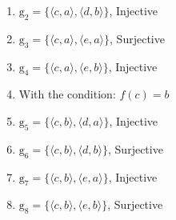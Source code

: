 \documentclass[10pt]{article}
\begin{document}
\begin{enumerate}
\begin{enumerate}
\begin{enumerate}
      \item $\mathrm{g}_{2}=\{\langle c, a\rangle, \langle d, b\rangle\}$, Injective
      \item $\mathrm{g}_{3}=\{\langle c, a\rangle, \langle e, a\rangle\}$, Surjective
      \item $\mathrm{g}_{4}=\{\langle c, a\rangle, \langle e, b\rangle\}$, Injective
      \item With the condition: $f(c)=b$
      \item $\mathrm{g}_{5}=\{\langle c, b\rangle, \langle d, a\rangle\}$, Injective
      \item $\mathrm{g}_{6}=\{\langle c, b\rangle, \langle d, b\rangle\}$, Surjective
      \item $\mathrm{g}_{7}=\{\langle c, b\rangle, \langle e, a\rangle\}$, Injective
      \item $\mathrm{g}_{8}=\{\langle c, b\rangle, \langle e, b\rangle\}$, Surjective


\end{enumerate}
\end{enumerate}
\end{enumerate}
\end{document}
